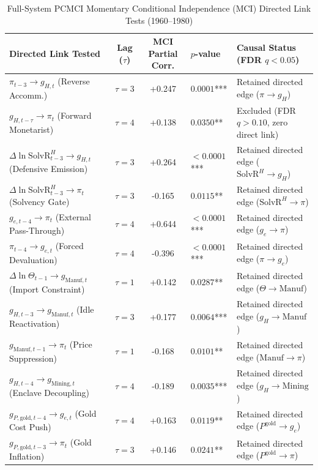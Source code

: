 \begin{table}[htbp]
\centering
\small
\caption{Full-System PCMCI Momentary Conditional Independence (MCI) Directed Link Tests (1960--1980)}
\label{tab:pcmci_monthly_gate}
\label{tab:pcmci_mci_links}
\begin{tabularx}{\textwidth}{>{\RaggedRight}p{4.5cm}cc>{\RaggedRight}p{2.0cm}>{\RaggedRight}X}
\toprule
\textbf{Directed Link Tested} & \textbf{Lag ($\tau$)} & \textbf{MCI Partial Corr.} & \textbf{$p$-value} & \textbf{Causal Status (FDR $q < 0.05$)} \\
\midrule
$\pi_{t-3} \to g_{H,t}$ (Reverse Accomm.) & $\tau = 3$ & +0.247 & $0.0001$*** & Retained directed edge ($\pi \to g_H$) \\
$g_{H,t-\tau} \to \pi_t$ (Forward Monetarist) & $\tau = 4$ & +0.138 & $0.0350$** & Excluded (FDR $q > 0.10$, zero direct link) \\
$\Delta \ln \text{SolvR}^H_{t-3} \to g_{H,t}$ (Defensive Emission) & $\tau = 3$ & +0.264 & $< 0.0001$*** & Retained directed edge ($\text{SolvR}^H \to g_H$) \\
$\Delta \ln \text{SolvR}^H_{t-3} \to \pi_t$ (Solvency Gate) & $\tau = 3$ & -0.165 & $0.0115$** & Retained directed edge ($\text{SolvR}^H \to \pi$) \\
$g_{e, t-4} \to \pi_t$ (External Pass-Through) & $\tau = 4$ & +0.644 & $< 0.0001$*** & Retained directed edge ($g_e \to \pi$) \\
$\pi_{t-4} \to g_{e, t}$ (Forced Devaluation) & $\tau = 4$ & -0.396 & $< 0.0001$*** & Retained directed edge ($\pi \to g_e$) \\
$\Delta \ln \Theta_{t-1} \to g_{\text{Manuf}, t}$ (Import Constraint) & $\tau = 1$ & +0.142 & $0.0287$** & Retained directed edge ($\Theta \to \text{Manuf}$) \\
$g_{H, t-3} \to g_{\text{Manuf}, t}$ (Idle Reactivation) & $\tau = 3$ & +0.177 & $0.0064$*** & Retained directed edge ($g_H \to \text{Manuf}$) \\
$g_{\text{Manuf}, t-1} \to \pi_t$ (Price Suppression) & $\tau = 1$ & -0.168 & $0.0101$** & Retained directed edge ($\text{Manuf} \to \pi$) \\
$g_{H, t-4} \to g_{\text{Mining}, t}$ (Enclave Decoupling) & $\tau = 4$ & -0.189 & $0.0035$*** & Retained directed edge ($g_H \to \text{Mining}$) \\
$g_{P,\text{gold}, t-4} \to g_{e, t}$ (Gold Cost Push) & $\tau = 4$ & +0.163 & $0.0119$** & Retained directed edge ($P^{\text{gold}} \to g_e$) \\
$g_{P,\text{gold}, t-3} \to \pi_t$ (Gold Inflation) & $\tau = 3$ & +0.146 & $0.0241$** & Retained directed edge ($P^{\text{gold}} \to \pi$) \\

\end{tabularx}
\end{table}
